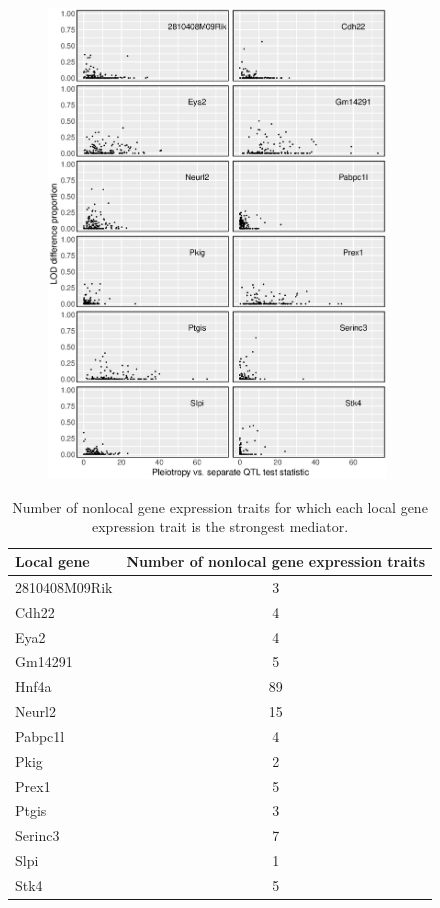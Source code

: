 \documentclass{article}
\begin{document}
\begin{figure}
    \centering
    \includegraphics[width = 0.8\textwidth]{../Rmd/12local-facet_grid-no-strip.eps}
    \caption{}
    \label{fig:nothnf4a-12}
\end{figure}






\begin{table}[ht]
\centering
\begin{tabular}{lc}
  \hline
 Local gene & Number of nonlocal gene expression traits \\ 
  \hline
2810408M09Rik &   3 \\ 
  Cdh22 &   4 \\ 
  Eya2 &   4 \\ 
  Gm14291 &   5 \\ 
  Hnf4a &  89 \\ 
  Neurl2 &  15 \\ 
  Pabpc1l &   4 \\ 
  Pkig &   2 \\ 
  Prex1 &   5 \\ 
  Ptgis &   3 \\ 
  Serinc3 &   7 \\ 
  Slpi &   1 \\ 
  Stk4 &   5 \\ 
   \hline
\end{tabular}
\caption{Number of nonlocal gene expression traits for which each local gene expression trait is the strongest mediator.}
\label{tab:med-count}
\end{table}
\end{document}
